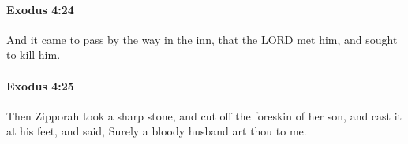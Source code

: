 		\paragraph{Exodus 4:24} %
			\label{EXODUS-4-24}

			And it came to pass by the way in the inn, that the LORD met him, and sought to kill him.


		\paragraph{Exodus 4:25} %
			\label{EXODUS-4-25}

			Then Zipporah took a sharp stone, and cut off the foreskin of her son, and cast it at his feet, and said, Surely a bloody husband art thou to me.


